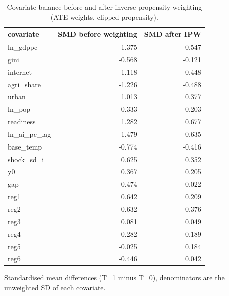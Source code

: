 \begin{table}[htbp]
\centering
\caption{Covariate balance before and after inverse-propensity weighting (ATE weights, clipped propensity).}
\label{tab:balance}
\begin{tabular}{lrr}
\toprule
covariate & SMD before weighting & SMD after IPW \\
\midrule
ln\_gdppc & 1.375 & 0.547 \\
gini & -0.568 & -0.121 \\
internet & 1.118 & 0.448 \\
agri\_share & -1.226 & -0.488 \\
urban & 1.013 & 0.377 \\
ln\_pop & 0.333 & 0.203 \\
readiness & 1.282 & 0.677 \\
ln\_ai\_pc\_lag & 1.479 & 0.635 \\
base\_temp & -0.774 & -0.416 \\
shock\_sd\_i & 0.625 & 0.352 \\
y0 & 0.367 & 0.205 \\
gap & -0.474 & -0.022 \\
reg1 & 0.642 & 0.209 \\
reg2 & -0.632 & -0.376 \\
reg3 & 0.081 & 0.049 \\
reg4 & 0.282 & 0.189 \\
reg5 & -0.025 & 0.184 \\
reg6 & -0.446 & 0.042 \\
\bottomrule
\end{tabular}
\par\smallskip\footnotesize Standardised mean differences (T=1 minus T=0), denominators are the unweighted SD of each covariate.
\end{table}

